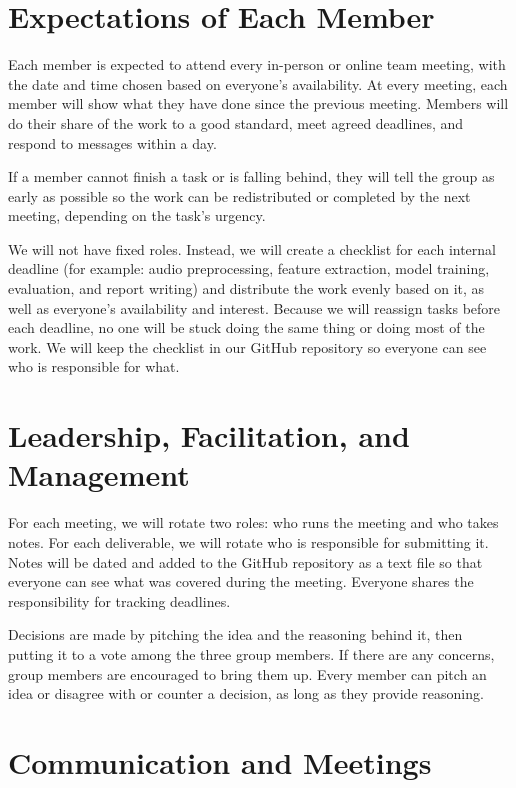 \documentclass[12pt]{article}
\begin{document}
\section{Expectations of Each Member}

Each member is expected to attend every in-person or online team meeting, with the date and time chosen based on everyone's availability. At every meeting, each member will show what they have done since the previous meeting. Members will do their share of the work to a good standard, meet agreed deadlines, and respond to messages within a day.

If a member cannot finish a task or is falling behind, they will tell the group as early as possible so the work can be redistributed or completed by the next meeting, depending on the task's urgency.

We will not have fixed roles. Instead, we will create a checklist for each internal deadline (for example: audio preprocessing, feature extraction, model training, evaluation, and report writing) and distribute the work evenly based on it, as well as everyone's availability and interest. Because we will reassign tasks before each deadline, no one will be stuck doing the same thing or doing most of the work. We will keep the checklist in our GitHub repository so everyone can see who is responsible for what.

\section{Leadership, Facilitation, and Management}

For each meeting, we will rotate two roles: who runs the meeting and who takes notes. For each deliverable, we will rotate who is responsible for submitting it. Notes will be dated and added to the GitHub repository as a text file so that everyone can see what was covered during the meeting. Everyone shares the responsibility for tracking deadlines.

Decisions are made by pitching the idea and the reasoning behind it, then putting it to a vote among the three group members. If there are any concerns, group members are encouraged to bring them up. Every member can pitch an idea or disagree with or counter a decision, as long as they provide reasoning.

\section{Communication and Meetings}
\end{document}
